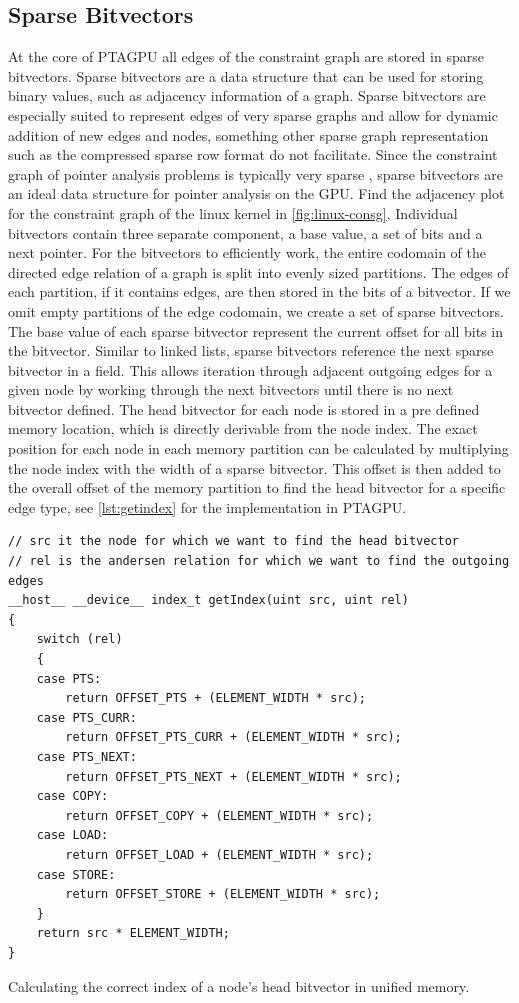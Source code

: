 \subsection{Sparse Bitvectors}
At the core of PTAGPU all edges of the constraint graph are stored in sparse bitvectors.
Sparse bitvectors are a data structure that can be used for storing binary values, such as adjacency information of a graph. Sparse bitvectors are especially suited to represent edges of very sparse graphs and allow for dynamic addition of new edges and nodes, something other sparse graph representation such as the compressed sparse row format do not facilitate. Since the constraint graph of pointer analysis problems is typically very sparse \cite{mendez2012gpu}, sparse bitvectors are an ideal data structure for pointer analysis on the GPU. Find the adjacency plot for the constraint graph of the linux kernel in \autoref{fig:linux-consg}.
Individual bitvectors contain three separate component, a base value, a set of bits and a next pointer.
For the bitvectors to efficiently work, the entire codomain of the directed edge relation of a graph is split into evenly sized partitions.
The edges of each partition, if it contains edges, are then stored in the bits of a bitvector. If we omit empty partitions of the edge codomain, we create a set of sparse bitvectors.
The base value of each sparse bitvector represent the current offset for all bits in the bitvector.
Similar to linked lists, sparse bitvectors reference the next sparse bitvector in a field. This allows iteration through adjacent outgoing edges for a given node by working through the next bitvectors until there is no next bitvector defined.
The head bitvector for each node is stored in a pre defined memory location, which is directly derivable from the node index.
The exact position for each node in each memory partition can be calculated by multiplying the node index with the width of a sparse bitvector. This offset is then added to the overall offset of the memory partition to find the head bitvector for a specific edge type, see \autoref{lst:getindex} for the implementation in PTAGPU.
\begin{listing}
    \begin{verbatim}
// src it the node for which we want to find the head bitvector
// rel is the andersen relation for which we want to find the outgoing edges
__host__ __device__ index_t getIndex(uint src, uint rel)
{
    switch (rel)
    {
    case PTS:
        return OFFSET_PTS + (ELEMENT_WIDTH * src);
    case PTS_CURR:
        return OFFSET_PTS_CURR + (ELEMENT_WIDTH * src);
    case PTS_NEXT:
        return OFFSET_PTS_NEXT + (ELEMENT_WIDTH * src);
    case COPY:
        return OFFSET_COPY + (ELEMENT_WIDTH * src);
    case LOAD:
        return OFFSET_LOAD + (ELEMENT_WIDTH * src);
    case STORE:
        return OFFSET_STORE + (ELEMENT_WIDTH * src);
    }
    return src * ELEMENT_WIDTH;
}
    \end{verbatim}
    \caption{Calculating the correct index of a node's head bitvector in unified memory.}
    \label{lst:getindex}
\end{listing}
